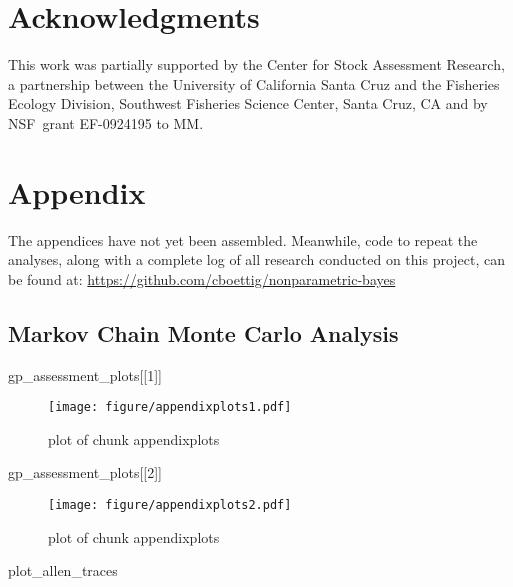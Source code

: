 \documentclass[author-year, review]{elsarticle} %
\makeatletter
\newenvironment{Shaded}{}{}
\newcommand{\DecValTok}[1]{\textcolor[rgb]{0.25,0.63,0.44}{{#1}}}
\newcommand{\NormalTok}[1]{{#1}}
\def\maxwidth{\ifdim\Gin@nat@width>\linewidth\linewidth
\else\Gin@nat@width\fi}
\let\Oldincludegraphics\includegraphics
\renewcommand{\includegraphics}[1]{\Oldincludegraphics[width=\maxwidth]{#1}}
\makeatother
\begin{document}
\section{Acknowledgments}

This work was partially supported by the Center for Stock Assessment
Research, a partnership between the University of California Santa Cruz
and the Fisheries Ecology Division, Southwest Fisheries Science Center,
Santa Cruz, CA and by NSF~grant EF-0924195 to MM.

\section{Appendix}

The appendices have not yet been assembled. Meanwhile, code to repeat
the analyses, along with a complete log of all research conducted on
this project, can be found at:
\href{https://github.com/cboettig/nonparametric-bayes/}{https://github.com/cboettig/nonparametric-bayes}

\subsection{Markov Chain Monte Carlo Analysis}

\begin{Shaded}
\begin{Highlighting}[]
\NormalTok{gp_assessment_plots[[}\DecValTok{1}\NormalTok{]]}
\end{Highlighting}
\end{Shaded}

\begin{figure}[htbp]
\centering
\texttt{[image: figure/appendixplots1.pdf]}
\caption{plot of chunk appendixplots}
\end{figure}

\begin{Shaded}
\begin{Highlighting}[]
\NormalTok{gp_assessment_plots[[}\DecValTok{2}\NormalTok{]]}
\end{Highlighting}
\end{Shaded}

\begin{figure}[htbp]
\centering
\texttt{[image: figure/appendixplots2.pdf]}
\caption{plot of chunk appendixplots}
\end{figure}

\begin{Shaded}
\begin{Highlighting}[]
\NormalTok{plot_allen_traces}
\end{Highlighting}
\end{Shaded}
\end{document}
